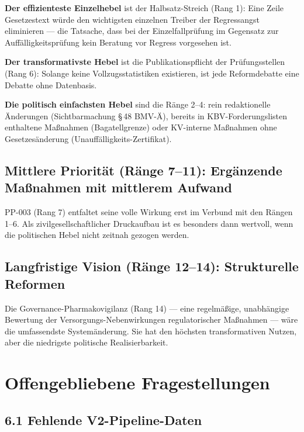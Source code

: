 \documentclass{umbruch-position}
\begin{document}
\textbf{Der effizienteste Einzelhebel} ist der Halbsatz-Streich (Rang 1): Eine Zeile Gesetzestext w\"urde den wichtigsten einzelnen Treiber der Regressangst eliminieren --- die Tatsache, dass bei der Einzelfallpr\"ufung im Gegensatz zur Auff\"alligkeitspr\"ufung kein \glqq{}Beratung vor Regress\grqq{} vorgesehen ist.

\textbf{Der transformativste Hebel} ist die Publikationspflicht der Pr\"ufungsstellen (Rang 6): Solange keine Vollzugsstatistiken existieren, ist jede Reformdebatte eine Debatte ohne Datenbasis.

\textbf{Die politisch einfachsten Hebel} sind die R\"ange 2--4: rein redaktionelle \"Anderungen (Sichtbarmachung \S\,48 BMV-\"A), bereits in KBV-Forderungslisten enthaltene Ma\ss{}nahmen (Bagatellgrenze) oder KV-interne Ma\ss{}nahmen ohne Gesetzes\"anderung (Unauff\"alligkeits-Zertifikat).

\subsection*{Mittlere Priorit\"at (R\"ange 7--11): Erg\"anzende Ma\ss{}nahmen mit mittlerem Aufwand}

PP-003 (Rang 7) entfaltet seine volle Wirkung erst im Verbund mit den R\"angen 1--6. Als zivilgesellschaftlicher Druckaufbau ist es besonders dann wertvoll, wenn die politischen Hebel nicht zeitnah gezogen werden.

\subsection*{Langfristige Vision (R\"ange 12--14): Strukturelle Reformen}

Die Governance-Pharmakovigilanz (Rang 14) --- eine regelm\"a\ss{}ige, unabh\"angige Bewertung der Versorgungs-Nebenwirkungen regulatorischer Ma\ss{}nahmen --- w\"are die umfassendste System\"anderung. Sie hat den h\"ochsten transformativen Nutzen, aber die niedrigste politische Realisierbarkeit.

\section{Offengebliebene Fragestellungen}

\subsection*{6.1 Fehlende V2-Pipeline-Daten}
\end{document}
